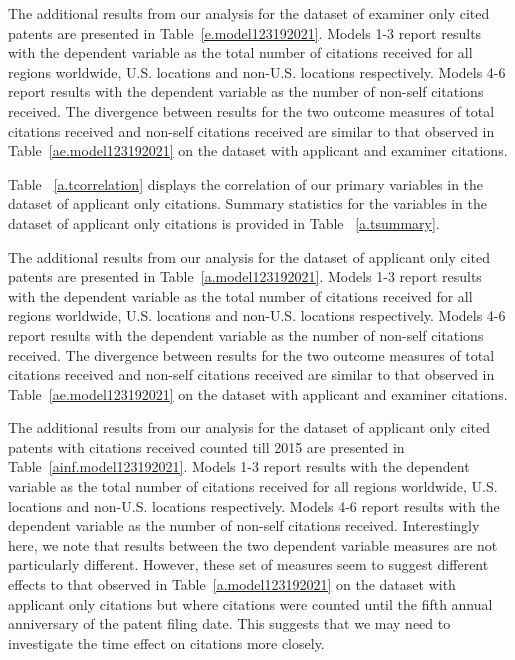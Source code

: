 \documentclass[12pt,letterpaper]{article}
\begin{document}







The additional results from our analysis for the dataset of examiner only cited patents are presented in Table~\ref{e.model123192021}. Models 1-3 report results with the dependent variable as the total number of citations received for all regions worldwide, U.S. locations and non-U.S. locations respectively. Models 4-6 report results with the dependent variable as the number of non-self citations received. The divergence between results for the two outcome measures of total citations received and non-self citations received are similar to that observed in Table~\ref{ae.model123192021} on the dataset with applicant and examiner citations. \par





Table ~\ref{a.tcorrelation} displays the correlation of our primary variables in the dataset of applicant only citations. Summary statistics for the variables in the dataset of applicant only citations is provided in Table ~\ref{a.tsummary}.








The additional results from our analysis for the dataset of applicant only cited patents are presented in Table~\ref{a.model123192021}. Models 1-3 report results with the dependent variable as the total number of citations received for all regions worldwide, U.S. locations and non-U.S. locations respectively. Models 4-6 report results with the dependent variable as the number of non-self citations received. The divergence between results for the two outcome measures of total citations received and non-self citations received are similar to that observed in Table~\ref{ae.model123192021} on the dataset with applicant and examiner citations. \par




The additional results from our analysis for the dataset of applicant only cited patents with citations received counted till 2015 are presented in Table~\ref{ainf.model123192021}. Models 1-3 report results with the dependent variable as the total number of citations received for all regions worldwide, U.S. locations and non-U.S. locations respectively. Models 4-6 report results with the dependent variable as the number of non-self citations received. Interestingly here, we note that results between the two dependent variable measures are not particularly different. However, these set of measures seem to suggest different effects to that observed in Table~\ref{a.model123192021} on the dataset with applicant only citations but where citations were counted until the fifth annual anniversary of the patent filing date. This suggests that we may need to investigate the time effect on citations more closely. \par
\end{document}
